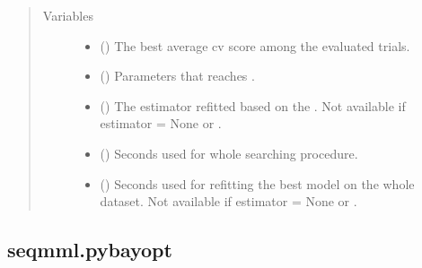 \documentclass[letterpaper,10pt,english]{sphinxmanual}
\begin{document}
\begin{fulllineitems}
\begin{sphinxVerbatim}[commandchars=\\\{\}]
 
\end{sphinxVerbatim}
\begin{quote}\begin{description}
\item[{Variables}] \leavevmode\begin{itemize}
\item {} 
 () \textendash{} The best average cv score among the evaluated trials.

\item {} 
 () \textendash{} Parameters that reaches .

\item {} 
 () \textendash{} The estimator refitted based on the . 
Not available if estimator = None or .

\item {} 
 () \textendash{} Seconds used for whole searching procedure.

\item {} 
 () \textendash{} Seconds used for refitting the best model on the whole dataset.
Not available if estimator = None or .

\end{itemize}

\end{description}\end{quote}

\end{fulllineitems}



\subsection{seqmml.pybayopt}
\label{\detokenize{apidoc:seqmml-pybayopt}}
\end{document}
